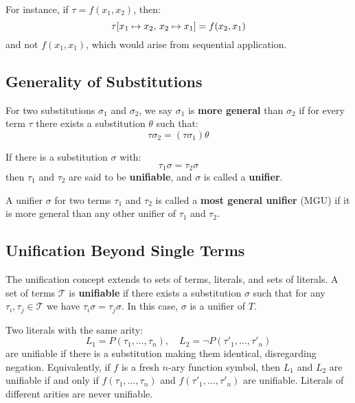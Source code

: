For instance, if \(\tau = f(x_1, x_2)\), then:
\begin{equation}
\tau[x_1 \mapsto x_2, \, x_2 \mapsto x_1] = f(x_2, x_1)
\end{equation}
and not \(f(x_1, x_1)\), which would arise from sequential application.

\subsection{Generality of  Substitutions}
For two substitutions \(\sigma_1\) and \(\sigma_2\), we say \(\sigma_1\) is \textbf{more general} than \(\sigma_2\) if for every term \(\tau\) there exists a substitution \(\theta\) such that:
\begin{equation}  
  \tau\sigma_2 = (\tau\sigma_1)\theta
\end{equation}

If there is a substitution \(\sigma\) with:
\begin{equation}
\tau_1\sigma = \tau_2\sigma
\end{equation}
then \(\tau_1\) and \(\tau_2\) are said to be \textbf{unifiable}, and \(\sigma\) is called a \textbf{unifier}.

A unifier \(\sigma\) for two terms \(\tau_1\) and \(\tau_2\) is called a \textbf{most general unifier} (MGU) if it is more general than any other unifier of \(\tau_1\) and \(\tau_2\).

\subsection{Unification Beyond Single Terms}
The unification concept extends to sets of terms, literals, and sets of literals.  
A set of terms \(\mathcal{T}\) is \textbf{unifiable} if there exists a substitution \(\sigma\) such that for any \(\tau_i, \tau_j \in \mathcal{T}\) we have \(\tau_i\sigma = \tau_j\sigma\). In this case, \(\sigma\) is a unifier of \(T\).

Two literals with the same arity:
\begin{equation}
L_1 = P(\tau_1, \ldots, \tau_n), \quad L_2 = \neg P(\tau'_1, \ldots, \tau'_n)
\end{equation}
are unifiable if there is a substitution making them identical, disregarding negation. Equivalently, if \(f\) is a fresh \(n\)-ary function symbol, then \(L_1\) and \(L_2\) are unifiable if and only if \(f(\tau_1, \ldots, \tau_n)\) and \(f(\tau'_1, \ldots, \tau'_n)\) are unifiable.  
Literals of different arities are never unifiable.

